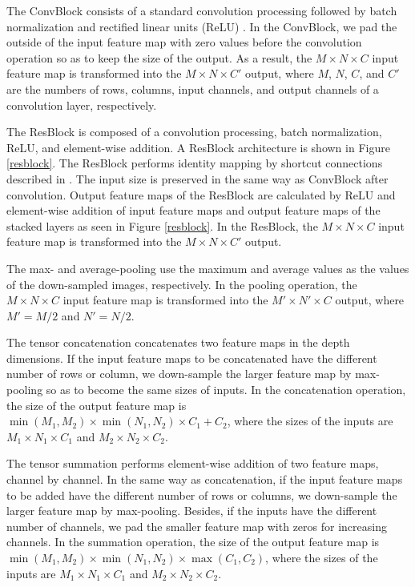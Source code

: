 The ConvBlock consists of a standard convolution processing followed by batch normalization \cite{ioffe_batch_2015} and rectified linear units (ReLU) \cite{nair_rectified_2010}. In the ConvBlock, we pad the outside of the input feature map with zero values before the convolution operation so as to keep the size of the output. 
As a result, the $M \times N \times C$ input feature map is transformed into the $M \times N \times C'$ output, where $M$, $N$, $C$, and $C'$ are the numbers of rows, columns, input channels, and output channels of a convolution layer, respectively.

The ResBlock is composed of a convolution processing, batch normalization, ReLU, and element-wise addition.
A ResBlock architecture is shown in Figure \ref{resblock}.
The ResBlock performs identity mapping by shortcut connections described in \cite{he_deep_2016}.
The input size is preserved in the same way as ConvBlock after convolution.
Output feature maps of the ResBlock are calculated by ReLU and element-wise addition of input feature maps and output feature maps of the stacked layers as seen in Figure \ref{resblock}.
In the ResBlock, the $M\times N\times C$ input feature map is transformed into the $M\times N\times C'$ output.

The max- and average-pooling use the maximum and average values as the values of the down-sampled images, respectively.
In the pooling operation, the $M \times N \times C$ input feature map is transformed into the $M' \times N' \times C$ output, where $M' = M/2$ and $N' = N/2$.

The tensor concatenation concatenates two feature maps in the depth dimensions.
If the input feature maps to be concatenated have the different number of rows or column, we down-sample the larger feature map by max-pooling so as to become the same sizes of inputs.
In the concatenation operation, the size of the output feature map is $\min (M_1, M_2) \times \min (N_1, N_2) \times C_1 + C_2$, where the sizes of the inputs are $M_1 \times N_1 \times C_1$ and $M_2 \times N_2 \times C_2$.

The tensor summation performs element-wise addition of two feature maps, channel by channel. 
In the same way as concatenation, if the input feature maps to be added have the different number of rows or columns, we down-sample the larger feature map by max-pooling.
Besides, if the inputs have the different number of channels, we pad the smaller feature map with zeros for increasing channels.
In the summation operation, the size of the output feature map is $\min (M_1, M_2) \times \min (N_1, N_2) \times \max (C_1, C_2)$, where the sizes of the inputs are $M_1 \times N_1 \times C_1$ and $M_2 \times N_2 \times C_2$.

